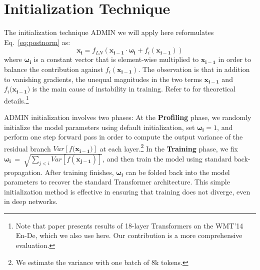 \section{Initialization Technique}
\label{sec:dnmt}

The initialization technique ADMIN \cite{liu2020deeptransformer} we will apply here reformulates Eq.~\ref{eq:postnorm} as:
\vspace{-2mm}
\begin{equation}
    \mathbf{x_{i}}=f_{LN}(\mathbf{x_{i-1}}\cdot \mathbf{\omega_i} + f_{i}(\mathbf{x_{i-1}}))
    \label{eq:admin}
\end{equation}
where $\mathbf{\omega_i}$ is a constant vector that is element-wise multiplied to $\mathbf{x_{i-1}}$ in order to balance the contribution against $f_{i}(\mathbf{x_{i-1}})$. 
The observation is that in addition to vanishing gradients, the unequal magnitudes in the two terms 
$\mathbf{x_{i-1}}$ and $f_{i}(\mathbf{x_{i-1})}$ is the main cause of instability in training.
Refer to \cite{liu2020deeptransformer} for theoretical details.\footnote{Note that paper presents results of 18-layer Transformers on the WMT'14 En-De, which we also use here. Our contribution is a more comprehensive evaluation.} 

ADMIN initialization involves two phases:
At the {\bf Profiling} phase, we randomly initialize the model parameters using default initialization, set $\mathbf{\omega_i}=1$, and perform one step forward pass in order to compute the output variance of the residual branch $Var[f(\mathbf{x_{i-1})}]$ at each layer.\footnote{We estimate the variance with one batch of 8k tokens.} In the {\bf Training} phase, we fix $\mathbf{\omega_i}~=~\sqrt{\sum_{j < i}{Var[f(\mathbf{x_{j-1}})]}}$, and then train the model using standard back-propagation. 
After training finishes, $\mathbf{\omega_i}$ can be folded back into the model parameters to recover the standard Transformer architecture. 
This simple initialization method is effective in ensuring that training does not diverge, even in deep networks. 